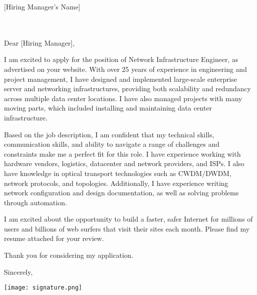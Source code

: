 \documentclass{letter}
\begin{document}
\begin{letter}{[Hiring Manager's Name]\\
    [Company Name]\\
    [Address]\\
    [City, State ZIP Code]}

\date{April 27, 2023}

\opening{Dear [Hiring Manager],}

I am excited to apply for the position of Network Infrastructure Engineer, as advertised on your website. With over 25 years of experience in engineering and project management, I have designed and implemented large-scale enterprise server and networking infrastructures, providing both scalability and redundancy across multiple data center locations. I have also managed projects with many moving parts, which included installing and maintaining data center infrastructure.

Based on the job description, I am confident that my technical skills, communication skills, and ability to navigate a range of challenges and constraints make me a perfect fit for this role. I have experience working with hardware vendors, logistics, datacenter and network providers, and ISPs. I also have knowledge in optical transport technologies such as CWDM/DWDM, network protocols, and topologies. Additionally, I have experience writing network configuration and design documentation, as well as solving problems through automation.

I am excited about the opportunity to build a faster, safer Internet for millions of users and billions of web surfers that visit their sites each month. Please find my resume attached for your review.

Thank you for considering my application.

Sincerely,

\texttt{[image: signature.png]}

\end{letter}
\end{document}
